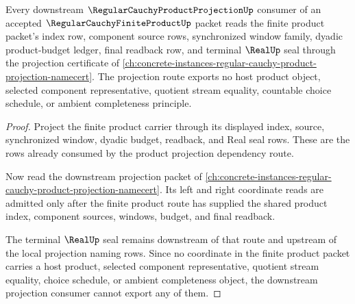 \begin{theorem}
\label{thm:regular-cauchy-finite-product-downstream-projection-route}
Every downstream $\RegularCauchyProductProjectionUp$ consumer of an accepted $\RegularCauchyFiniteProductUp$ packet reads the finite product packet's index row, component source rows, synchronized window family, dyadic product-budget ledger, final readback row, and terminal $\RealUp$ seal through the projection certificate of \autoref{ch:concrete-instances-regular-cauchy-product-projection-namecert}. The projection route exports no host product object, selected component representative, quotient stream equality, countable choice schedule, or ambient completeness principle.
\end{theorem}
\begin{proof}
Project the finite product carrier through its displayed index, source, synchronized window, dyadic budget, readback, and Real seal rows. These are the rows already consumed by the product projection dependency route.

Now read the downstream projection packet of \autoref{ch:concrete-instances-regular-cauchy-product-projection-namecert}. Its left and right coordinate reads are admitted only after the finite product route has supplied the shared product index, component sources, windows, budget, and final readback.

The terminal $\RealUp$ seal remains downstream of that route and upstream of the local projection naming rows. Since no coordinate in the finite product packet carries a host product, selected component representative, quotient stream equality, choice schedule, or ambient completeness object, the downstream projection consumer cannot export any of them.
\end{proof}
